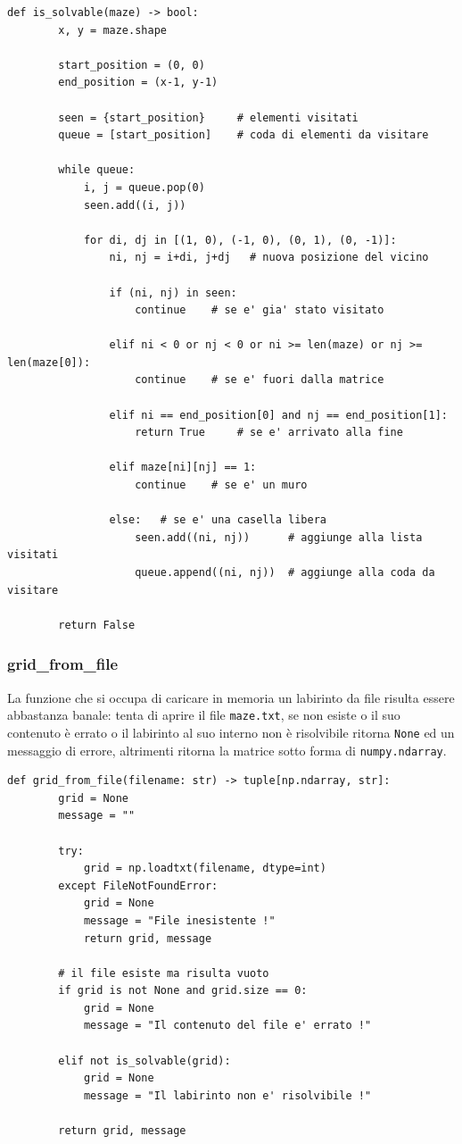 \begin{lstlisting}[style=python, caption={Funzione per controllare la risolvibilit\`{a} dei labirinti}]
	def is_solvable(maze) -> bool:
		x, y = maze.shape
		
		start_position = (0, 0)
		end_position = (x-1, y-1)

		seen = {start_position}     # elementi visitati
		queue = [start_position]    # coda di elementi da visitare
	
		while queue:
			i, j = queue.pop(0)
			seen.add((i, j))
	
			for di, dj in [(1, 0), (-1, 0), (0, 1), (0, -1)]:
				ni, nj = i+di, j+dj   # nuova posizione del vicino
				
				if (ni, nj) in seen:
					continue	# se e' gia' stato visitato
	
				elif ni < 0 or nj < 0 or ni >= len(maze) or nj >= len(maze[0]):
					continue	# se e' fuori dalla matrice
	
				elif ni == end_position[0] and nj == end_position[1]:
					return True		# se e' arrivato alla fine
	
				elif maze[ni][nj] == 1:
					continue	# se e' un muro
	
				else: 	# se e' una casella libera
					seen.add((ni, nj))      # aggiunge alla lista visitati
					queue.append((ni, nj))  # aggiunge alla coda da visitare
	
		return False
\end{lstlisting}

\subsubsection{grid\_from\_file}
La funzione che si occupa di caricare in memoria un labirinto da file risulta essere abbastanza banale: tenta di aprire il file \lstinline[style=cmd]|maze.txt|, se non esiste o il suo contenuto \`{e} errato o il labirinto al suo interno non \`{e} risolvibile ritorna \lstinline[style=cmd]|None| ed un messaggio di errore, altrimenti ritorna la matrice sotto forma di \lstinline[style=cmd]|numpy.ndarray|.

\begin{lstlisting}[style=python, caption={Funzione per il caricamento in memoria di un labirinto da file}]
	def grid_from_file(filename: str) -> tuple[np.ndarray, str]:
		grid = None
		message = ""
	
		try:
			grid = np.loadtxt(filename, dtype=int)
		except FileNotFoundError:
			grid = None
			message = "File inesistente !"
			return grid, message
	
		# il file esiste ma risulta vuoto
		if grid is not None and grid.size == 0:
			grid = None
			message = "Il contenuto del file e' errato !"
	
		elif not is_solvable(grid):
			grid = None
			message = "Il labirinto non e' risolvibile !"
	
		return grid, message
\end{lstlisting}

